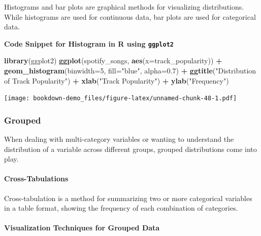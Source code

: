 \documentclass[
  b5paper]{book}
\newenvironment{Shaded}{\begin{snugshade}}{\end{snugshade}}
\newcommand{\AttributeTok}[1]{\textcolor[rgb]{0.13,0.29,0.53}{#1}}
\newcommand{\DecValTok}[1]{\textcolor[rgb]{0.00,0.00,0.81}{#1}}
\newcommand{\FloatTok}[1]{\textcolor[rgb]{0.00,0.00,0.81}{#1}}
\newcommand{\FunctionTok}[1]{\textcolor[rgb]{0.13,0.29,0.53}{\textbf{#1}}}
\newcommand{\NormalTok}[1]{#1}
\newcommand{\SpecialCharTok}[1]{\textcolor[rgb]{0.81,0.36,0.00}{\textbf{#1}}}
\newcommand{\StringTok}[1]{\textcolor[rgb]{0.31,0.60,0.02}{#1}}
\begin{document}
Histograms and bar plots are graphical methods for visualizing distributions. While histograms are used for continuous data, bar plots are used for categorical data.

\textbf{Code Snippet for Histogram in R using \texttt{ggplot2}}

\begin{Shaded}
\begin{Highlighting}[]
\FunctionTok{library}\NormalTok{(ggplot2)}
\FunctionTok{ggplot}\NormalTok{(spotify\_songs, }\FunctionTok{aes}\NormalTok{(}\AttributeTok{x=}\NormalTok{track\_popularity)) }\SpecialCharTok{+}
  \FunctionTok{geom\_histogram}\NormalTok{(}\AttributeTok{binwidth=}\DecValTok{5}\NormalTok{, }\AttributeTok{fill=}\StringTok{"blue"}\NormalTok{, }\AttributeTok{alpha=}\FloatTok{0.7}\NormalTok{) }\SpecialCharTok{+}
  \FunctionTok{ggtitle}\NormalTok{(}\StringTok{"Distribution of Track Popularity"}\NormalTok{) }\SpecialCharTok{+}
  \FunctionTok{xlab}\NormalTok{(}\StringTok{"Track Popularity"}\NormalTok{) }\SpecialCharTok{+}
  \FunctionTok{ylab}\NormalTok{(}\StringTok{"Frequency"}\NormalTok{)}
\end{Highlighting}
\end{Shaded}

\texttt{[image: bookdown-demo\_files/figure-latex/unnamed-chunk-48-1.pdf]}

\hypertarget{grouped}{%
\subsubsection{Grouped}\label{grouped}}

When dealing with multi-category variables or wanting to understand the distribution of a variable across different groups, grouped distributions come into play.

\hypertarget{cross-tabulations}{%
\paragraph{Cross-Tabulations}\label{cross-tabulations}}

Cross-tabulation is a method for summarizing two or more categorical variables in a table format, showing the frequency of each combination of categories.

\hypertarget{visualization-techniques-for-grouped-data}{%
\paragraph{Visualization Techniques for Grouped Data}\label{visualization-techniques-for-grouped-data}}
\end{document}
